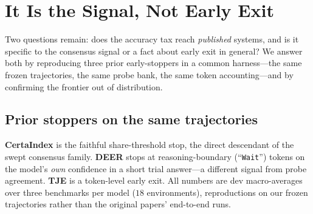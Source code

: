 \section{It Is the Signal, Not Early Exit}
\label{sec:baselines}

Two questions remain: does the accuracy tax reach \emph{published} systems, and
is it specific to the consensus signal or a fact about early exit in general? We
answer both by reproducing three prior early-stoppers in a common harness---the
same frozen trajectories, the same \simplek{} probe bank, the same token
accounting---and by confirming the frontier out of distribution.

\subsection{Prior stoppers on the same trajectories}
\textbf{CertaIndex} \citep{dynasor_certaindex} is the faithful share-threshold
stop, the direct descendant of the swept consensus family. \textbf{DEER}
\citep{deer} stops at reasoning-boundary (``\texttt{Wait}'') tokens on the
model's \emph{own} confidence in a short trial answer---a different signal from
probe agreement. \textbf{TJE} \citep{tje} is a token-level early exit. All
numbers are dev macro-averages over three benchmarks per model ($18$
environments), reproductions on our frozen trajectories rather than the original
papers' end-to-end runs.

